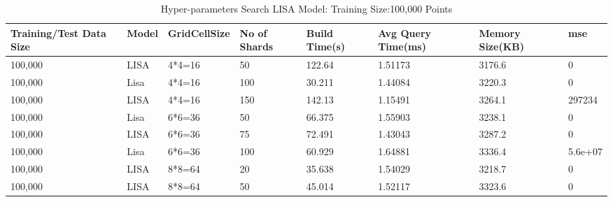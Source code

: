 \begin{table}
	\centering
	\begin{tabular}{||p{}<{\centering}|p{}<{\centering}|p{}<{\centering}| p{}<{\centering}|p{}<{\centering}|p{}<{\centering}|p{}<{\centering}|p{}<{\centering}||}
		\hline
		Training/Test Data Size& Model & GridCellSize & No of Shards & Build Time(s) & Avg Query Time(ms) & Memory Size(KB)&mse\\ [0.5ex] 
		\hline
		\hline
		\hline
		100,000& LISA& 4*4=16 & 50& 122.64& 1.51173 & 3176.6&0\\
		\hline
		100,000& Lisa& 4*4=16 & 100& 30.211& 1.44084 & 3220.3&0\\
		\hline
		100,000& LISA& 4*4=16 & 150& 142.13&1.15491 & 3264.1&297234\\
		\hline
		100,000& Lisa& 6*6=36 & 50& 66.375& 1.55903 & 3238.1&0\\
		\hline
		100,000& LISA& 6*6=36 & 75& 72.491& 1.43043 & 3287.2&0\\
		\hline
		100,000& Lisa& 6*6=36 & 100& 60.929& 1.64881 & 3336.4&5.6e+07\\
		\hline
		100,000& LISA& 8*8=64 & 20& 35.638& 1.54029 & 3218.7&0\\
		\hline
		100,000& LISA& 8*8=64 & 50& 45.014& 1.52117 & 3323.6&0\\
		\hline
		\hline
	\end{tabular}
    \caption{Hyper-parameters Search LISA Model: Training Size:100,000 Points}
	\label{small_lognormal_lisa_100000}
\end{table}

